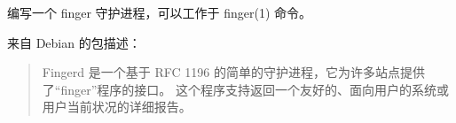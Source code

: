\begin{Exercise}[title={*Finger 守护进程},difficulty=8]
\label{ex:finger}
\Question
编写一个 finger 守护进程，可以工作于 finger(1) 命令。

来自 Debian 的包描述：
\begin{quote}
Fingerd 是一个基于 RFC 1196 \cite{RFC1196} 的简单的守护进程，它为许多站点提供了“finger”程序的接口。
这个程序支持返回一个友好的、面向用户的系统或用户当前状况的详细报告。
\end{quote}

\end{Exercise}
